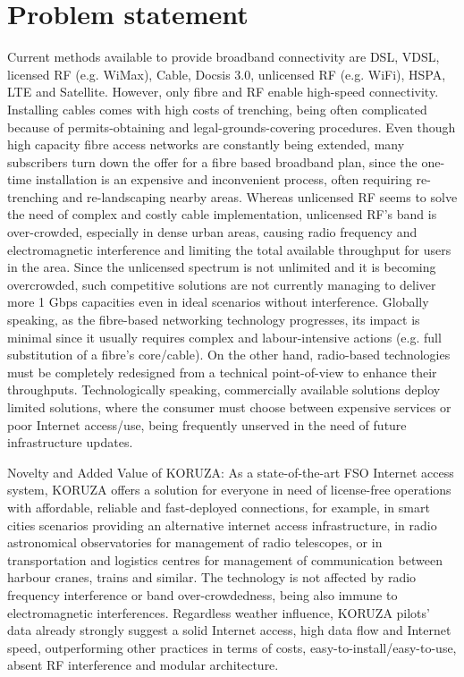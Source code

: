 \section{Problem statement}
Current methods available to provide broadband connectivity are DSL, VDSL, licensed RF (e.g. WiMax), Cable, Docsis 3.0, unlicensed RF (e.g. WiFi), HSPA, LTE and Satellite. However, only fibre and RF enable high-speed connectivity. Installing cables comes with high costs of trenching, being often complicated because of permits-obtaining and legal-grounds-covering procedures. Even though high capacity fibre access networks are constantly being extended, many subscribers turn down the offer for a fibre based broadband plan, since the one-time installation is an expensive and inconvenient process, often requiring re-trenching and re-landscaping nearby areas. Whereas unlicensed RF seems to solve the need of complex and costly cable implementation, unlicensed RF’s band is over-crowded, especially in dense urban areas, causing radio frequency and electromagnetic interference and limiting the total available throughput for users in the area. Since the unlicensed spectrum is not unlimited and it is becoming overcrowded, such competitive solutions are not currently managing to deliver more 1 Gbps capacities even in ideal scenarios without interference. Globally speaking, as the fibre-based networking technology progresses, its impact is minimal since it usually requires complex and labour-intensive actions (e.g. full substitution of a fibre’s core/cable). On the other hand, radio-based technologies must be completely redesigned from a technical point-of-view to enhance their throughputs. Technologically speaking, commercially available solutions deploy limited solutions, where the consumer must choose between expensive services or poor Internet access/use, being frequently unserved in the need of future infrastructure updates.

Novelty and Added Value of KORUZA: As a state-of-the-art FSO Internet access system, KORUZA offers a solution for everyone in need of license-free operations with affordable, reliable and fast-deployed connections, for example, in smart cities scenarios providing an alternative internet access infrastructure, in radio astronomical observatories for management of radio telescopes, or in transportation and logistics centres for management of communication between harbour cranes, trains and similar. The technology is not affected by radio frequency interference or band over-crowdedness, being also immune to electromagnetic interferences. Regardless weather influence, KORUZA pilots’ data already strongly suggest a solid Internet access, high data flow and Internet speed, outperforming other practices in terms of costs, easy-to-install/easy-to-use, absent RF interference and modular architecture.

